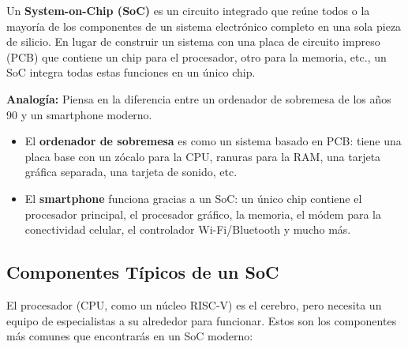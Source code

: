 \documentclass[12pt,a4paper]{article}
\begin{document}
Un \textbf{System-on-Chip (SoC)} es un circuito integrado que reúne todos o la mayoría de los componentes de un sistema electrónico completo en una sola pieza de silicio. En lugar de construir un sistema con una placa de circuito impreso (PCB) que contiene un chip para el procesador, otro para la memoria, etc., un SoC integra todas estas funciones en un único chip.

\textbf{Analogía:} Piensa en la diferencia entre un ordenador de sobremesa de los años 90 y un smartphone moderno.
\begin{itemize}
    \item El \textbf{ordenador de sobremesa} es como un sistema basado en PCB: tiene una placa base con un zócalo para la CPU, ranuras para la RAM, una tarjeta gráfica separada, una tarjeta de sonido, etc.
    \item El \textbf{smartphone} funciona gracias a un SoC: un único chip contiene el procesador principal, el procesador gráfico, la memoria, el módem para la conectividad celular, el controlador Wi-Fi/Bluetooth y mucho más.
\end{itemize}

\subsection{Componentes Típicos de un SoC}

El procesador (CPU, como un núcleo RISC-V) es el cerebro, pero necesita un equipo de especialistas a su alrededor para funcionar. Estos son los componentes más comunes que encontrarás en un SoC moderno:
\end{document}
